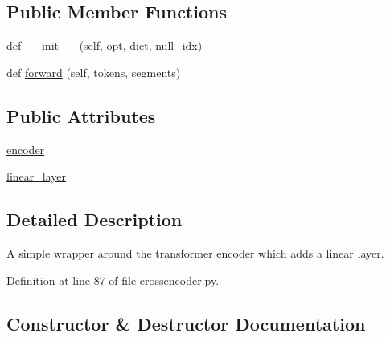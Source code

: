 \subsection*{Public Member Functions}
\begin{DoxyCompactItemize}
\item 
def \hyperlink{classparlai_1_1agents_1_1transformer_1_1crossencoder_1_1CrossEncoderModule_ad002e8a3432930432430e2b4c435cc3e}{\+\_\+\+\_\+init\+\_\+\+\_\+} (self, opt, dict, null\+\_\+idx)
\item 
def \hyperlink{classparlai_1_1agents_1_1transformer_1_1crossencoder_1_1CrossEncoderModule_a86a9cf18bddebb5a1ee9c4096cfe7c20}{forward} (self, tokens, segments)
\end{DoxyCompactItemize}
\subsection*{Public Attributes}
\begin{DoxyCompactItemize}
\item 
\hyperlink{classparlai_1_1agents_1_1transformer_1_1crossencoder_1_1CrossEncoderModule_a7b3493099f48331b36c465cc393b5145}{encoder}
\item 
\hyperlink{classparlai_1_1agents_1_1transformer_1_1crossencoder_1_1CrossEncoderModule_a50568203fcea07cca868109b95dc8dfc}{linear\+\_\+layer}
\end{DoxyCompactItemize}


\subsection{Detailed Description}
\begin{DoxyVerb}A simple wrapper around the transformer encoder which adds a linear layer.
\end{DoxyVerb}
 

Definition at line 87 of file crossencoder.\+py.



\subsection{Constructor \& Destructor Documentation}
\mbox{\label{classparlai_1_1agents_1_1transformer_1_1crossencoder_1_1CrossEncoderModule_ad002e8a3432930432430e2b4c435cc3e}} 
